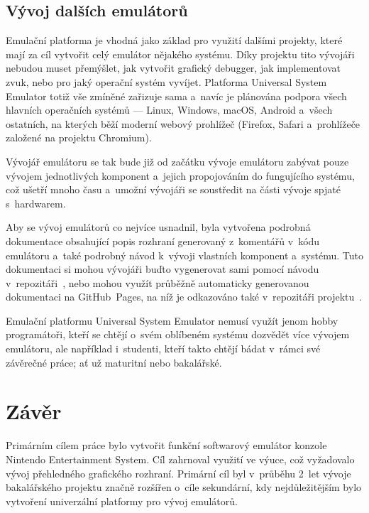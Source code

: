 \section{Vývoj dalších emulátorů}
Emulační platforma je vhodná jako základ pro využití dalšími projekty, které mají za cíl vytvořit celý emulátor nějakého systému. Díky projektu tito vývojáři nebudou muset přemýšlet, jak vytvořit grafický debugger, jak implementovat zvuk, nebo pro jaký operační systém vyvíjet. Platforma Universal System Emulator totiž vše zmíněné zařizuje sama a~navíc je plánována podpora všech hlavních operačních systémů --- Linux, Windows, macOS, Android a~všech ostatních, na kterých běží moderní webový prohlížeč (Firefox, Safari a~prohlížeče založené na projektu Chromium).

Vývojář emulátoru se tak bude již od začátku vývoje emulátoru zabývat pouze vývojem jednotlivých komponent a~jejich propojováním do fungujícího systému, což ušetří mnoho času a~umožní vývojáři se soustředit na části vývoje spjaté s~hardwarem.

Aby se vývoj emulátorů co nejvíce usnadnil, byla vytvořena podrobná dokumentace obsahující popis rozhraní generovaný z~komentářů v~kódu emulátoru a~také podrobný návod k~vývoji vlastních komponent a~systému. Tuto dokumentaci si mohou vývojáři buďto vygenerovat sami pomocí návodu v~repozitáři~\cite{Golasowski2023:use}, nebo mohou využít průběžně automaticky generovanou dokumentaci na GitHub~Pages, na níž je odkazováno také v~repozitáři projektu~\cite{Golasowski2023:use}.

Emulační platformu Universal System Emulator nemusí využít jenom hobby programátoři, kteří se chtějí o~svém oblíbeném systému dozvědět více vývojem emulátoru, ale například i~studenti, kteří takto chtějí bádat v~rámci své závěrečné práce; ať už maturitní nebo bakalářské.

\chapter*{Závěr}
Primárním cílem práce bylo vytvořit funkční softwarový emulátor konzole Nintendo Entertainment System. Cíl zahrnoval využití ve výuce, což vyžadovalo vývoj přehledného grafického rozhraní. Primární cíl byl v~průběhu 2~let vývoje bakalářského projektu značně rozšířen o~cíle sekundární, kdy nejdůležitějším bylo vytvoření univerzální platformy pro vývoj emulátorů.

